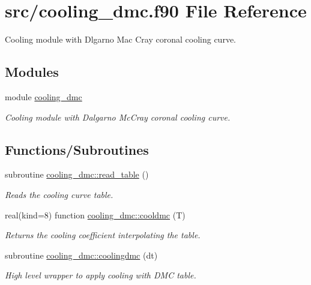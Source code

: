 \hypertarget{cooling__dmc_8f90}{}\section{src/cooling\+\_\+dmc.f90 File Reference}
\label{cooling__dmc_8f90}


Cooling module with Dlgarno Mac Cray coronal cooling curve.  


\subsection*{Modules}
\begin{DoxyCompactItemize}
\item 
module \hyperlink{namespacecooling__dmc}{cooling\+\_\+dmc}
\begin{DoxyCompactList}\small\item\em Cooling module with Dalgarno Mc\+Cray coronal cooling curve. \end{DoxyCompactList}\end{DoxyCompactItemize}
\subsection*{Functions/\+Subroutines}
\begin{DoxyCompactItemize}
\item 
subroutine \hyperlink{namespacecooling__dmc_a7874b4f8a76399e87e0a22aecd088cf8}{cooling\+\_\+dmc\+::read\+\_\+table} ()
\begin{DoxyCompactList}\small\item\em Reads the cooling curve table. \end{DoxyCompactList}\item 
real(kind=8) function \hyperlink{namespacecooling__dmc_af987bbf144f596d57b154427bbb82ae5}{cooling\+\_\+dmc\+::cooldmc} (T)
\begin{DoxyCompactList}\small\item\em Returns the cooling coefficient interpolating the table. \end{DoxyCompactList}\item 
subroutine \hyperlink{namespacecooling__dmc_ad51341dd3b898a1fe0f7c298cf7e49ce}{cooling\+\_\+dmc\+::coolingdmc} (dt)
\begin{DoxyCompactList}\small\item\em High level wrapper to apply cooling with D\+M\+C table. \end{DoxyCompactList}\end{DoxyCompactItemize}
